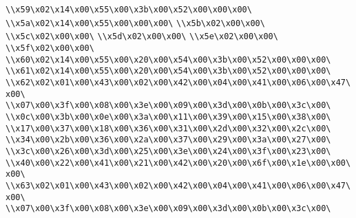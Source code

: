 \verb|\\x59\x02\x14\x00\x55\x00\x3b\x00\x52\x00\x00\x00\|\newline
\verb|\\x5a\x02\x14\x00\x55\x00\x00\x00\|\newline
\verb|\\x5b\x02\x00\x00\|\newline
\verb|\\x5c\x02\x00\x00\|\newline
\verb|\\x5d\x02\x00\x00\|\newline
\verb|\\x5e\x02\x00\x00\|\newline
\verb|\\x5f\x02\x00\x00\|\newline
\verb|\\x60\x02\x14\x00\x55\x00\x20\x00\x54\x00\x3b\x00\x52\x00\x00\x00\|\newline
\verb|\\x61\x02\x14\x00\x55\x00\x20\x00\x54\x00\x3b\x00\x52\x00\x00\x00\|\newline
\verb|\\x62\x02\x01\x00\x43\x00\x02\x00\x42\x00\x04\x00\x41\x00\x06\x00\x47\x00\|\newline
\verb|\\x07\x00\x3f\x00\x08\x00\x3e\x00\x09\x00\x3d\x00\x0b\x00\x3c\x00\|\newline
\verb|\\x0c\x00\x3b\x00\x0e\x00\x3a\x00\x11\x00\x39\x00\x15\x00\x38\x00\|\newline
\verb|\\x17\x00\x37\x00\x18\x00\x36\x00\x31\x00\x2d\x00\x32\x00\x2c\x00\|\newline
\verb|\\x34\x00\x2b\x00\x36\x00\x2a\x00\x37\x00\x29\x00\x3a\x00\x27\x00\|\newline
\verb|\\x3c\x00\x26\x00\x3d\x00\x25\x00\x3e\x00\x24\x00\x3f\x00\x23\x00\|\newline
\verb|\\x40\x00\x22\x00\x41\x00\x21\x00\x42\x00\x20\x00\x6f\x00\x1e\x00\x00\x00\|\newline
\verb|\\x63\x02\x01\x00\x43\x00\x02\x00\x42\x00\x04\x00\x41\x00\x06\x00\x47\x00\|\newline
\verb|\\x07\x00\x3f\x00\x08\x00\x3e\x00\x09\x00\x3d\x00\x0b\x00\x3c\x00\|\newline

